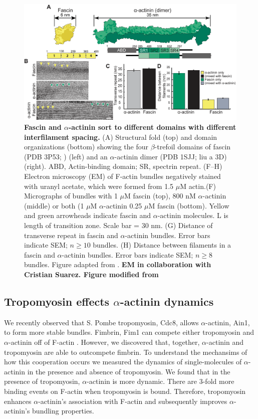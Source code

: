 \begin{figure}
\centering
\includegraphics[width=14cm]{img/ch03/Thesis_EM_fig.png}
\caption[Fascin and \texorpdfstring{$\alpha$}{alpha}-actinin sort to different domains with different interfilament spacing.]{\textbf{Fascin and $\alpha$-actinin sort to different domains with different interfilament spacing.} (A) Structural fold (top) and domain organizations (bottom) showing the four $\beta$-trefoil domains of fascin (PDB 3P53; \citep{jansen_mechanism_2011}) (left) and an $\alpha$-actinin dimer (PDB 1SJJ; {liu a 3D}) (right). ABD, Actin-binding domain; SR, spectrin repeat. (F–H) Electron microscopy (EM) of F-actin bundles negatively stained with uranyl acetate, which were formed from 1.5 $\mu$M actin.(F) Micrographs of bundles with 1 $\mu$M fascin (top), 800 nM $\alpha$-actinin (middle) or both (1 $\mu$M $\alpha$-actinin 0.25 $\mu$M fascin (bottom). Yellow and green arrowheads indicate fascin and $\alpha$-actinin molecules. L is length of transition zone. Scale bar = 30 nm. (G) Distance of transverse repeat in fascin and $\alpha$-actinin bundles. Error bars indicate SEM; $n\geq10$ bundles. (H) Distance between filaments in a fascin and $\alpha$-actinin bundles. Error bars indicate SEM; $n\geq8$ bundles. Figure adapted from \citep{winkelman_fascin-_2016}. \textbf{EM in collaboration with Cristian Suarez. Figure modified from \citep{winkelman_fascin-_2016}}}
\label{fig:em_fascin_aact}
\end{figure}

\subsection{Tropomyosin effects \texorpdfstring{$\alpha$}{a}-actinin dynamics}
We recently observed that S. Pombe tropomyosin, Cdc8, allows $\alpha$-actinin, Ain1, to form more stable bundles. Fimbrin, Fim1 can compete either tropomyosin and $\alpha$-actinin off of F-actin \citep{christensen_competition_2017}. However, we discovered that, together, $\alpha$-actinin and tropomyosin are able to outcompete fimbrin. To understand the mechansims of how this cooperation occurs we measured the dynamics of single-molecules of $\alpha$-actinin in the presence and absence of tropomyosin. We found that in the presence of tropomyosin, $\alpha$-actinin is more dynamic. There are 3-fold more binding events on F-actin when tropomyosin is bound. Therefore, tropomyosin enhances $\alpha$-actinin's association with F-actin and subsequently improves $\alpha$-actinin's bundling properties. 



